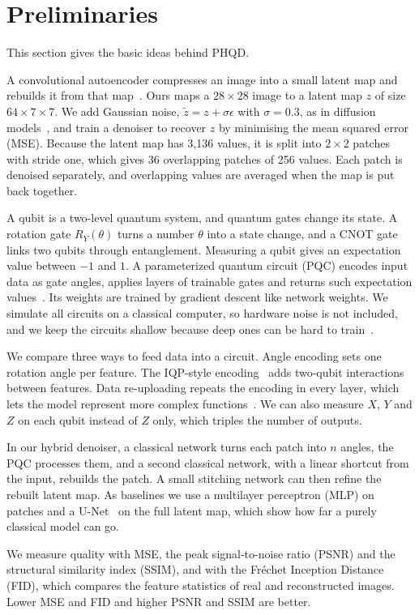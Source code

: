 \section{Preliminaries}\label{sec:prelim}
This section gives the basic ideas behind PHQD.

A convolutional autoencoder compresses an image into a small latent map and rebuilds it from that map~\cite{rombach}. Ours maps a $28\times28$ image to a latent map $z$ of size $64\times7\times7$. We add Gaussian noise, $\tilde z=z+\sigma\epsilon$ with $\sigma=0.3$, as in diffusion models~\cite{ho}, and train a denoiser to recover $z$ by minimising the mean squared error (MSE). Because the latent map has 3,136 values, it is split into $2\times2$ patches with stride one, which gives 36 overlapping patches of 256 values. Each patch is denoised separately, and overlapping values are averaged when the map is put back together.

A qubit is a two-level quantum system, and quantum gates change its state. A rotation gate $R_Y(\theta)$ turns a number $\theta$ into a state change, and a CNOT gate links two qubits through entanglement. Measuring a qubit gives an expectation value between $-1$ and $1$. A parameterized quantum circuit (PQC) encodes input data as gate angles, applies layers of trainable gates and returns such expectation values~\cite{cerezo,benedetti}. Its weights are trained by gradient descent like network weights. We simulate all circuits on a classical computer, so hardware noise is not included, and we keep the circuits shallow because deep ones can be hard to train~\cite{mcclean}.

We compare three ways to feed data into a circuit. Angle encoding sets one rotation angle per feature. The IQP-style encoding~\cite{havlicek} adds two-qubit interactions between features. Data re-uploading repeats the encoding in every layer, which lets the model represent more complex functions~\cite{schuld}. We can also measure $X$, $Y$ and $Z$ on each qubit instead of $Z$ only, which triples the number of outputs.

In our hybrid denoiser, a classical network turns each patch into $n$ angles, the PQC processes them, and a second classical network, with a linear shortcut from the input, rebuilds the patch. A small stitching network can then refine the rebuilt latent map. As baselines we use a multilayer perceptron (MLP) on patches and a U-Net~\cite{unet} on the full latent map, which show how far a purely classical model can go.

We measure quality with MSE, the peak signal-to-noise ratio (PSNR) and the structural similarity index (SSIM), and with the Fr\'echet Inception Distance (FID), which compares the feature statistics of real and reconstructed images. Lower MSE and FID and higher PSNR and SSIM are better.

